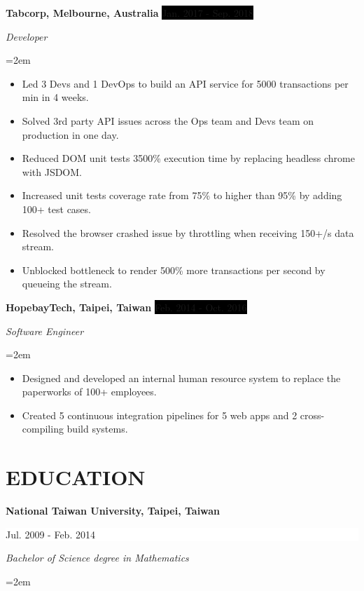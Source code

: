 \documentclass[a4paper, 11pt]{article}
\newcommand{\sepspace}{\vspace*{0.3em}}       %
\newcommand{\NewPart}[1]{\section*{\uppercase{#1}}}
\newcommand{\EducationEntry}[4]{
		\noindent \textbf{#1} \hfill      %
		\colorbox{White}{%
			\parbox{5cm}{%
			\hfill\color{Black}#2}} \par  %
		\noindent \textit{#3} \par        %
		\noindent\hangindent=2em\hangafter=0 \small #4 %
		\normalsize \par}
\newcommand{\WorkEntry}[4]{				  %
		\noindent \textbf{#1} \hfill      %
		\noindent\colorbox{Black}{\color{White}#2} \par  %
		\noindent \textit{#3} \par              %
		\noindent\hangindent=2em\hangafter=0 \small #4 %
		\normalsize \par}
\newcommand{\PrjEntry}[4]{				  %
		\noindent \textbf{#1} \hfill      %
		\noindent\colorbox{Black}{\color{White}#2} \par  %
		\noindent \textit{#3} \par              %
		\noindent\hangindent=2em\hangafter=0 \small #4 %
		\normalsize \par}
\begin{document}
\sepspace

\WorkEntry{Tabcorp, Melbourne, Australia}{Jan. 2017 - Sep. 2018}{Developer}{
\begin{itemize}
	\item {Led 3 Devs and 1 DevOps to build an API service for 5000 transactions per min in 4 weeks.}
	\item {Solved 3rd party API issues across the Ops team and Devs team on production in one day.}
	\item {Reduced DOM unit tests 3500\% execution time by replacing headless chrome with JSDOM.}
	\item {Increased unit tests coverage rate from 75\% to higher than 95\% by adding 100+ test cases.}
	\item {Resolved the browser crashed issue by throttling when receiving 150+/s data stream.}
	\item {Unblocked bottleneck to render 500\% more transactions per second by queueing the stream.}
\end{itemize}
}

\sepspace

\WorkEntry{HopebayTech, Taipei, Taiwan}{Feb. 2014 - Oct. 2016}{Software Engineer}{
\begin{itemize}
	\item {Designed and developed an internal human resource system to replace the paperworks of 100+ employees.}
	\item {Created 5 continuous integration pipelines for 5 web apps and 2 cross-compiling build systems.}
\end{itemize}
}

\NewPart{Education}{}

\EducationEntry{National Taiwan University, Taipei, Taiwan}{Jul. 2009 - Feb. 2014}
{Bachelor of Science degree in Mathematics}{}


\end{document}
